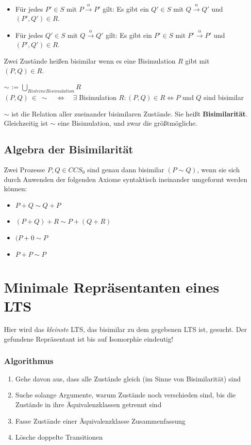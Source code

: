 \documentclass[a4paper,10pt, oneside]{book}
\begin{document}
\begin{itemize}
 \item Für jedes $P' \in S$ mit $P \xrightarrow{\alpha} P'$ gilt: Es gibt ein $Q' \in S$ mit $Q \xrightarrow{\alpha} Q'$ und $(P',Q') \in R$.
 \item Für jedes $Q' \in S$ mit $Q \xrightarrow{\alpha} Q'$ gilt: Es gibt ein $P' \in S$ mit $P' \xrightarrow{\alpha} P'$ und $(P', Q') \in R$.
\end{itemize}
Zwei Zustände heißen bisimilar wenn es eine Bisimulation $R$ gibt mit $(P,Q) \in R$.

\begin{center}
$ \sim $ \quad := \quad $\bigcup_{R ist eine Bisimulation} R$\\
$ (P,Q) \: \in \: \sim \quad \Leftrightarrow \quad \exists$ Bisimulation $R : (P,Q) \in R \Leftrightarrow P$ und $Q$ sind bisimilar
\end{center}
$\sim$ ist die Relation aller zueinander bisimilaren Zustände. Sie heißt \textbf{Bisimilarität}. Gleichzeitig ist $\sim$ eine Bisimulation, und zwar die größtmögliche.

\subsection*{Algebra der Bisimilarität}
Zwei Prozesse $P,Q \in CCS_0$ sind genau dann bisimilar $(P \sim Q)$, wenn sie sich durch Anwenden der folgenden Axiome syntaktisch ineinander umgeformt werden können:
\begin{itemize}
 \item $P + Q \sim Q + P$
 \item $(P + Q) + R \sim P + (Q + R)$
 \item $(P + 0 \sim P$
 \item $P + P \sim P$
\end{itemize}

\section{Minimale Repräsentanten eines LTS}
Hier wird das \textit{kleinste} LTS, das bisimilar zu dem gegebenen LTS ist, gesucht. Der gefundene Repräsentant ist bis auf Isomorphie eindeutig!

\subsubsection*{Algorithmus}
\begin{enumerate}
 \item Gehe davon aus, dass alle Zustände gleich (im Sinne von Bisimilarität) sind
 \item Suche solange Argumente, warum Zustände noch verschieden sind, bis die Zustände in ihre Äquivalenzklassen getrennt sind
 \item Fasse Zustände einer Äquivalenzklasse Zusammenfassung
 \item Lösche doppelte Transitionen
\end{enumerate}
\end{document}
